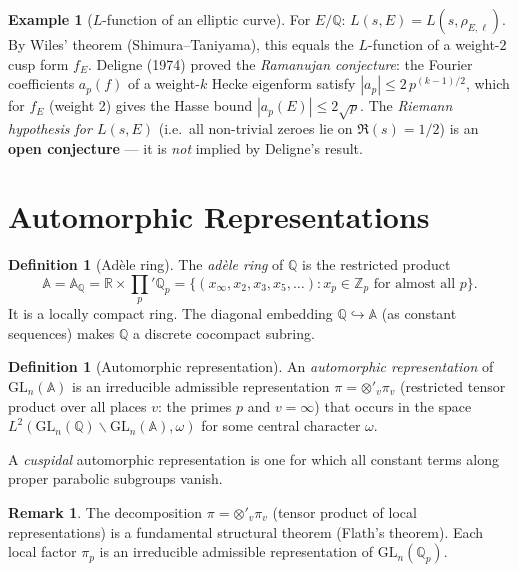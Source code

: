 \documentclass[12pt,a4paper]{amsart}
\theoremstyle{definition}
\newtheorem{definition}[theorem]{Definition}
\newtheorem{example}[theorem]{Example}
\newtheorem{remark}[theorem]{Remark}
\newcommand{\Z}{\mathbb{Z}}
\newcommand{\Q}{\mathbb{Q}}
\newcommand{\R}{\mathbb{R}}
\newcommand{\GL}{\mathrm{GL}}
\begin{document}
\begin{example}[$L$-function of an elliptic curve]
For $E/\Q$: $L(s, E) = L(s, \rho_{E,\ell})$.  By Wiles' theorem (Shimura--Taniyama),
this equals the $L$-function of a weight-$2$ cusp form $f_E$.
Deligne (1974) proved the \emph{Ramanujan conjecture}: the Fourier coefficients
$a_p(f)$ of a weight-$k$ Hecke eigenform satisfy $|a_p| \le 2\,p^{(k-1)/2}$,
which for $f_E$ (weight 2) gives the Hasse bound $|a_p(E)| \le 2\sqrt{p}$.
The \emph{Riemann hypothesis for $L(s,E)$} (i.e.\ all non-trivial zeroes lie
on $\Re(s) = 1/2$) is an \textbf{open conjecture} — it is \emph{not} implied
by Deligne's result.
\end{example}

\section{Automorphic Representations}

\begin{definition}[Adèle ring]
\label{def:adeles}
The \emph{adèle ring} of $\Q$ is the restricted product
\[
  \mathbb{A} = \mathbb{A}_\Q = \R \times \prod_p{}' \Q_p
  = \bigl\{(x_\infty, x_2, x_3, x_5, \ldots) : x_p \in \Z_p \text{ for almost all } p\bigr\}.
\]
It is a locally compact ring.  The diagonal embedding $\Q \hookrightarrow \mathbb{A}$
(as constant sequences) makes $\Q$ a discrete cocompact subring.
\end{definition}

\begin{definition}[Automorphic representation]
\label{def:automorphic_rep}
An \emph{automorphic representation} of $\GL_n(\mathbb{A})$ is an irreducible
admissible representation $\pi = \otimes'_v \pi_v$ (restricted tensor product over
all places $v$: the primes $p$ and $v = \infty$) that occurs in the space
$L^2(\GL_n(\Q) \backslash \GL_n(\mathbb{A}), \omega)$ for some central character $\omega$.

A \emph{cuspidal} automorphic representation is one for which all constant
terms along proper parabolic subgroups vanish.
\end{definition}

\begin{remark}
The decomposition $\pi = \otimes'_v \pi_v$ (tensor product of local representations)
is a fundamental structural theorem (Flath's theorem).  Each local factor $\pi_p$
is an irreducible admissible representation of $\GL_n(\Q_p)$.
\end{remark}
\end{document}
